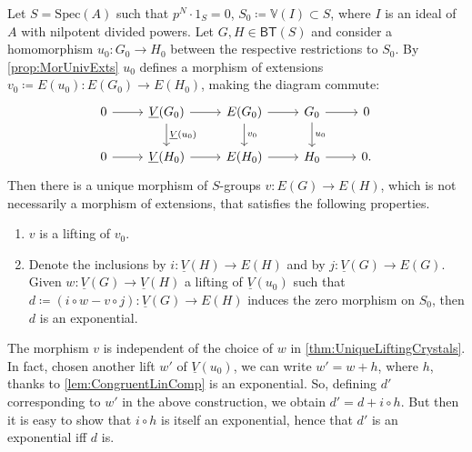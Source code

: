 \begin{thm}\label{thm:UniqueLiftingCrystals}
	Let $S = \mathrm{Spec}(A)$ such that $p^N \cdot 1_S = 0$,
	$S_0 \coloneqq \mathbb{V}(I) \subset S$, where $I$ is
	an ideal of $A$ with nilpotent divided powers.
	Let $G, H \in \mathsf{BT}(S)$ and consider a homomorphism
	$u_0\colon G_0 \to H_0$ between the respective restrictions to $S_0$.
	By \cref{prop:MorUnivExts} $u_0$ defines
	a morphism of extensions $v_0 \coloneqq E(u_0)\colon E(G_0) \to E(H_0)$,
	making the diagram commute:
	\begin{equation*}
	\begin{tikzcd}
		0 \arrow[r, "", rightarrow] &
		\underline{V}(G_0) \arrow[d, "\underline{V}(u_0)", rightarrow] 
		\arrow[r, "", rightarrow] &
		E(G_0) \arrow[d, "v_0", rightarrow]
		\arrow[r, "", rightarrow] &
		G_0 \arrow[d, "u_0", rightarrow]
		\arrow[r, "", rightarrow] &
		0 \\
		0 \arrow[r, "", rightarrow] &
		\underline{V}(H_0) \arrow[r, "", rightarrow] &
		E(H_0) \arrow[r, "", rightarrow] &
		H_0 \arrow[r, "", rightarrow] &
		0
	.\end{tikzcd}
	\end{equation*}
	Then there is a unique morphism of $S$-groups
	$v\colon E(G) \to E(H)$, which is not necessarily a morphism
	of extensions, that satisfies the following properties.
\begin{enumerate}
	\item $v$ is a lifting of $v_0$.

	\item Denote the inclusions by $i\colon \underline{V}(H) \to E(H)$ and by 
		$j\colon \underline{V}(G) \to E(G)$.
		Given $w\colon \underline{V}(G) \to \underline{V}(H)$ a lifting of $\underline{V}(u_0)$
		such that $d\coloneqq (i \circ w - v \circ j)\colon \underline{V}(G) \to E(H)$
		induces the zero morphism on $S_0$, then $d$ is an exponential.
\end{enumerate}
\end{thm}


\begin{rem}
	The morphism $v$ is independent of the choice of $w$
	in \cref{thm:UniqueLiftingCrystals}.
	In fact, chosen another lift $w'$ of $\underline{V}(u_0)$, we 
	can write $w' = w + h$, where $h$, thanks to \cref{lem:CongruentLinComp}
	is an exponential.
	So, defining $d'$ corresponding to $w'$ in the
	above construction, we obtain $d' = d + i \circ h$.
	But then it is easy to show that $i \circ h$ is
	itself an exponential, hence that $d'$ is an
	exponential iff $d$ is.
\end{rem}


